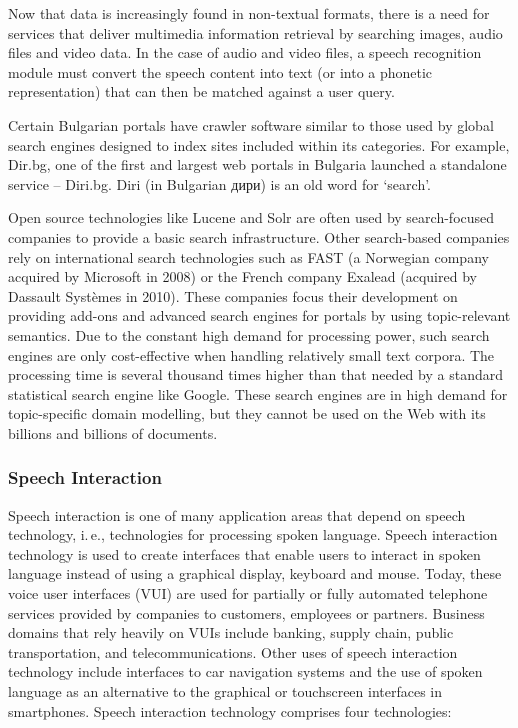 \documentclass[]{../../metanetpaper}
\begin{document}
\begin{multicols}{2}
Now that data is increasingly found in non-textual formats, there is a need for services that deliver multimedia information retrieval by searching images, audio files and video data. In the case of audio and video files, a speech recognition module must convert the speech content into text (or into a phonetic representation) that can then be matched against a user query.

Certain Bulgarian portals have crawler software similar to those used by global search engines designed to index sites included within its categories. For example, Dir.bg, one of the first and largest web portals in Bulgaria launched a standalone service – Diri.bg. Diri (in Bulgarian {дири}) is an old word for ‘search’. 

Open source technologies like Lucene and Solr are often used by search-focused companies to provide a basic search infrastructure. Other search-based companies rely on international search technologies such as FAST (a Norwegian company acquired by Microsoft in 2008) or the French company Exalead (acquired by Dassault Systèmes in 2010). These companies focus their development on providing add-ons and advanced search engines for portals by using topic-relevant semantics. Due to the constant high demand for processing power, such search engines are only cost-effective when handling relatively small text corpora. The processing time is several thousand times higher than that needed by a standard statistical search engine like Google. These search engines are in high demand for topic-specific domain modelling, but they cannot be used on the Web with its billions and billions of documents.

\subsubsection{Speech Interaction}

Speech interaction is one of many application areas that depend on speech technology, i.\,e., technologies for processing spoken language. Speech interaction technology is used to create interfaces that enable users to interact in spoken language instead of using a graphical display, keyboard and mouse.  Today, these voice user interfaces (VUI) are used for partially or fully automated telephone services provided by companies to customers, employees or partners. Business domains that rely heavily on VUIs include banking, supply chain, public transportation, and telecommunications. Other uses of speech interaction technology include interfaces to car navigation systems and the use of spoken language as an alternative to the graphical or touchscreen interfaces in smartphones. Speech interaction technology comprises four technologies: 


\end{multicols}
\end{document}
